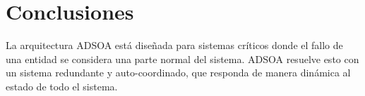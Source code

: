 \documentclass[conference,compsoc]{IEEEtran}
\begin{document}
\section{Conclusiones}

La arquitectura ADSOA está diseñada para sistemas críticos donde el fallo de una entidad se considera una parte normal del sistema. ADSOA resuelve esto con un sistema redundante y auto-coordinado, que responda de manera dinámica al estado de todo el sistema.

\printbibliography
\end{document}

